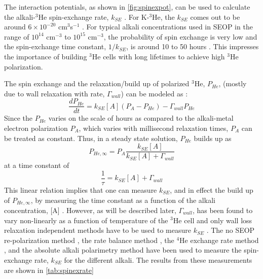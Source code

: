 The interaction potentials, as shown in \cref{fig:spinexpot}, can be used to calculate the alkali-$^3$He spin-exchange rate, $k_{SE}$ \cite{Partridge2001, Tscherbul2011}. For K-$^3$He, the $k_{SE}$ comes out to be around $6 \times 10^{-20}$ cm$^3$s$^{-1}$ \cite{Gentile2017, Happer1972, Walker1997}. For typical alkali concentrations used in SEOP in the range of $10^{14}$ cm$^{-3}$ to $10^{15}$ cm$^{-3}$, the probability of spin exchange is very low and the spin-exchange time constant, $1/k_{SE}$, is around 10 to 50 hours \cite{Gentile2017}. This impresses the importance of building $^3$He cells with long lifetimes to achieve high $^3$He polarization.

The spin exchange and the relaxation/build up of polarized $^3$He, $P_{He}$, (mostly due to wall relaxation with rate, $\Gamma_{wall}$) can be modeled as \cite{Wu2021}:
\begin{equation}
    \frac{dP_{He}}{dt} = k_{SE} [A] (P_{A} -P_{He}) - \Gamma_{wall} P_{He}
\end{equation}
Since the $P_{He}$ varies on the scale of hours as compared to the alkali-metal electron polarization $P_{A}$, which varies with millisecond relaxation times, $P_{A}$ can be treated as constant. Thus, in a steady state solution, $P_{He}$ builds up as
\begin{equation}
    P_{He, \infty} = P_{A} \frac{k_{SE} [A]}{k_{SE} [A] + \Gamma_{wall}}
\end{equation}
at a time constant of
\begin{equation}
    \frac{1}{\tau} = k_{SE} [A] + \Gamma_{wall}
    \label{eq:SEtime}
\end{equation}
This linear relation implies that one can measure $k_{SE}$, and in effect the build up of $P_{He, \infty}$, by measuring the time constant as a function of the alkali concentration, [A] \cite{Gentile2017}. However, as will be described later, $\Gamma_{wall}$, has been found to vary non-linearly as a function of temperature of the $^3$He cell and only wall loss relaxation independent methods have to be used to measure $k_{SE}$ \cite{Gentile2017}. The no SEOP re-polarization method \cite{Ben-AmarBaranga1998, Chann2002a, Borel2003}, the rate balance method \cite{Chann2002a}, the $^4$He exchange rate method \cite{Walker2010}, and the absolute alkali polarimetry method \cite{Singh2015} have been used to measure the spin-exchange rate, $k_{SE}$ for the different alkali. The results from these measurements are shown in \cref{tab:spinexrate}

